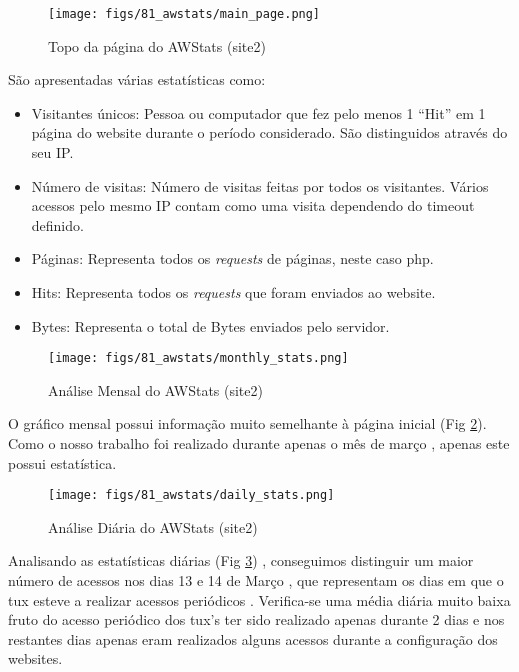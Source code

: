 \begin{figure}
    \centering
    \texttt{[image: figs/81\_awstats/main\_page.png]}
    \caption{Topo da página do AWStats (site2)}
    \label{fig:main_awstats}
\end{figure}

São apresentadas várias estatísticas como:
\begin{itemize}
    \item Visitantes únicos: Pessoa ou computador que fez pelo menos 1 “Hit” em 1 página do website durante o período considerado. São distinguidos através do seu IP.
    \item Número de visitas: Número de visitas feitas por todos os visitantes. Vários acessos pelo mesmo IP contam como uma visita dependendo do timeout definido.
    \item Páginas: Representa todos os \textit{requests} de páginas, neste caso php.
    \item Hits: Representa todos os \textit{requests} que foram enviados ao website.
    \item Bytes: Representa o total de Bytes enviados pelo servidor.
\end{itemize}

\begin{figure}
    \centering
    \texttt{[image: figs/81\_awstats/monthly\_stats.png]}
    \caption{Análise Mensal do AWStats (site2)}
    \label{fig:monthly_awstats}
\end{figure}

O gráfico mensal possui informação muito semelhante à página inicial (Fig \ref{fig:monthly_awstats}).
Como o nosso trabalho foi realizado durante apenas o mês de março , apenas este possui estatística.

\begin{figure}
    \centering
    \texttt{[image: figs/81\_awstats/daily\_stats.png]}
    \caption{Análise Diária do AWStats (site2)}
    \label{fig:daily_awstats}
\end{figure}

Analisando as estatísticas diárias (Fig \ref{fig:daily_awstats}) , conseguimos distinguir um maior número de acessos nos dias 13 e 14 de Março , que representam os dias em que o tux esteve a realizar acessos periódicos .
Verifica-se uma média diária muito baixa fruto do acesso periódico dos tux’s ter sido realizado apenas durante 2 dias e nos restantes dias apenas eram realizados alguns acessos durante a configuração dos websites.

